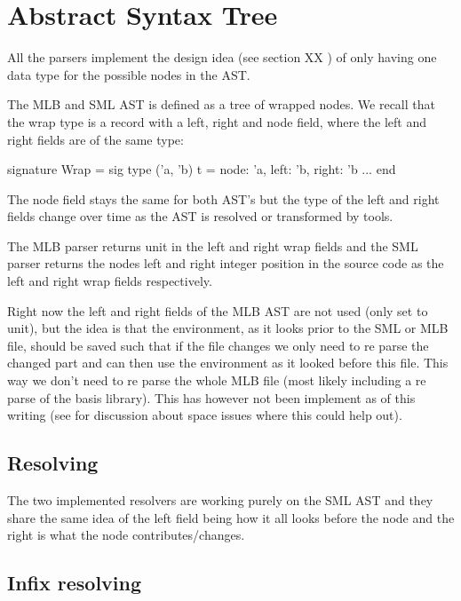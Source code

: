 \section{Abstract Syntax Tree}

All the parsers implement the design idea (see section XX )
of only having one data type for the possible nodes in the AST. 

The MLB and SML AST is defined as a tree of wrapped nodes. We recall that the
wrap type is a record with a left, right and node field, where the left and
right fields are of the same type:

\begin{sml}
signature Wrap =
sig
  type ('a, 'b) t = {node: 'a, left: 'b, right: 'b}
  ...
end
\end{sml}

The node field stays the same for both AST's but the type of the left and right
fields change over time as the AST is resolved or transformed by tools.

The MLB parser returns unit in the left and right wrap fields and the SML parser
returns the nodes left and right integer position in the source code as the left
and right wrap fields respectively.

Right now the left and right fields of the MLB AST are not used (only set to
unit), but the idea is that the environment, as it looks prior to the SML or MLB
file, should be saved such that if the file changes we only need to re parse the
changed part and can then use the environment as it looked before this
file. This way we don't need to re parse the whole MLB file (most likely
including a re parse of the basis library). This has however not been implement
as of this writing (see  for discussion about space issues
where this could help out).

\subsection{Resolving}

The two implemented resolvers are working purely on the SML AST and they share
the same idea of the left field being how it all looks before the node and the
right is what the node contributes/changes.

\subsection{Infix resolving}

